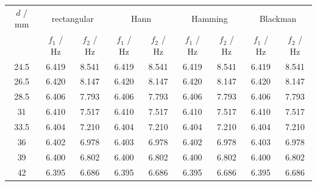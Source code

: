 \begin{tabular}{@{}ccccccccc@{}}
\toprule
$d$ / mm & \multicolumn{2}{c}{rectangular} & \multicolumn{2}{c}{Hann} & \multicolumn{2}{c}{Hamming} & \multicolumn{2}{c}{Blackman} \\
 & $f_1$ / Hz & $f_2$ / Hz & $f_1$ / Hz & $f_2$ / Hz & $f_1$ / Hz & $f_2$ / Hz & $f_1$ / Hz & $f_2$ / Hz \\
\midrule
24.5 & 6.419 & 8.541 & 6.419 & 8.541 & 6.419 & 8.541 & 6.419 & 8.541 \\
26.5 & 6.420 & 8.147 & 6.420 & 8.147 & 6.420 & 8.147 & 6.420 & 8.147 \\
28.5 & 6.406 & 7.793 & 6.406 & 7.793 & 6.406 & 7.793 & 6.406 & 7.793 \\
31 & 6.410 & 7.517 & 6.410 & 7.517 & 6.410 & 7.517 & 6.410 & 7.517 \\
33.5 & 6.404 & 7.210 & 6.404 & 7.210 & 6.404 & 7.210 & 6.404 & 7.210 \\
36 & 6.402 & 6.978 & 6.403 & 6.978 & 6.402 & 6.978 & 6.403 & 6.978 \\
39 & 6.400 & 6.802 & 6.400 & 6.802 & 6.400 & 6.802 & 6.400 & 6.802 \\
42 & 6.395 & 6.686 & 6.395 & 6.686 & 6.395 & 6.686 & 6.395 & 6.686 \\
\bottomrule
\end{tabular}
